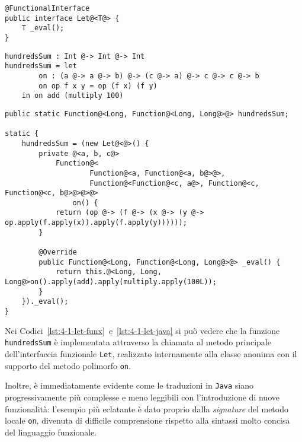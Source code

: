 \vspace{4mm}
\begin{lstlisting}[caption={Interfaccia funzionale per espressioni \texttt{let}}, style=javaCode, label={lst:4-1-let-interface-java}]
@FunctionalInterface
public interface Let@<T@> {
    T _eval();
}
\end{lstlisting}
\vspace{4mm}
\begin{lstlisting}[caption={Espressione \texttt{let} in \textbf{Funx}}, style=funxCode, label={lst:4-1-let-funx}]
hundredsSum : Int @-> Int @-> Int
hundredsSum = let
        on : (a @-> a @-> b) @-> (c @-> a) @-> c @-> c @-> b
        on op f x y = op (f x) (f y)
    in on add (multiply 100)
\end{lstlisting}
\vspace{4mm}
\begin{lstlisting}[caption={Corrispondente classe anonima in \texttt{Java}}, style=javaCode, label={lst:4-1-let-java}]
public static Function@<Long, Function@<Long, Long@>@> hundredsSum;

static {
    hundredsSum = (new Let@<@>() {
        private @<a, b, c@>
            Function@<
                    Function@<a, Function@<a, b@>@>,
                    Function@<Function@<c, a@>, Function@<c, Function@<c, b@>@>@>@>
                on() {
            return (op @-> (f @-> (x @-> (y @-> op.apply(f.apply(x)).apply(f.apply(y))))));
        }

        @Override
        public Function@<Long, Function@<Long, Long@>@> _eval() {
            return this.@<Long, Long, Long@>on().apply(add).apply(multiply.apply(100L));
        }
    })._eval();
}
\end{lstlisting}
\vspace{4mm}

\noindent Nei Codici~\ref{lst:4-1-let-funx}~e~\ref{lst:4-1-let-java} si può vedere che la funzione \texttt{hundredsSum}
è implementata attraverso la chiamata al metodo principale dell'interfaccia funzionale \texttt{Let},
realizzato internamente alla classe anonima con il supporto del metodo polimorfo \texttt{on}.

\noindent Inoltre, è immediatamente evidente come le traduzioni in \texttt{Java} siano progressivamente più complesse e meno leggibili
con l'introduzione di nuove funzionalità: l'esempio più eclatante è dato proprio dalla \textit{signature} del metodo locale \texttt{on},
divenuta di difficile comprensione rispetto alla sintassi molto concisa del linguaggio funzionale.